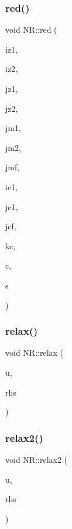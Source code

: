 \subsubsection{\texorpdfstring{red()}{red()}}
{\footnotesize\ttfamily void N\+R\+::red (\begin{DoxyParamCaption}\item[{const int}]{iz1,  }\item[{const int}]{iz2,  }\item[{const int}]{jz1,  }\item[{const int}]{jz2,  }\item[{const int}]{jm1,  }\item[{const int}]{jm2,  }\item[{const int}]{jmf,  }\item[{const int}]{ic1,  }\item[{const int}]{jc1,  }\item[{const int}]{jcf,  }\item[{const int}]{kc,  }\item[{\mbox{\hyperlink{namespaceNR_a3cb7a4c8eb0a2a98a239a9a8200ec5d8}{Mat3\+D\+\_\+\+I\+\_\+\+DP}} \&}]{c,  }\item[{\mbox{\hyperlink{namespaceNR_ad1513aa4697878ed3bff0b8b3c9dd910}{Mat\+\_\+\+I\+O\+\_\+\+DP}} \&}]{s }\end{DoxyParamCaption})}

\mbox{\label{namespaceNR_addb2b8e753b62caf1b43dd6f236c651a}} 
\subsubsection{\texorpdfstring{relax()}{relax()}}
{\footnotesize\ttfamily void N\+R\+::relax (\begin{DoxyParamCaption}\item[{\mbox{\hyperlink{namespaceNR_ad1513aa4697878ed3bff0b8b3c9dd910}{Mat\+\_\+\+I\+O\+\_\+\+DP}} \&}]{u,  }\item[{\mbox{\hyperlink{namespaceNR_a2b8abfda8fffad6ba0a1b5a4c0773dbf}{Mat\+\_\+\+I\+\_\+\+DP}} \&}]{rhs }\end{DoxyParamCaption})}

\mbox{\label{namespaceNR_ab35ff057ba423e15b9661f578781f9fd}} 
\subsubsection{\texorpdfstring{relax2()}{relax2()}}
{\footnotesize\ttfamily void N\+R\+::relax2 (\begin{DoxyParamCaption}\item[{\mbox{\hyperlink{namespaceNR_ad1513aa4697878ed3bff0b8b3c9dd910}{Mat\+\_\+\+I\+O\+\_\+\+DP}} \&}]{u,  }\item[{\mbox{\hyperlink{namespaceNR_a2b8abfda8fffad6ba0a1b5a4c0773dbf}{Mat\+\_\+\+I\+\_\+\+DP}} \&}]{rhs }\end{DoxyParamCaption})}

